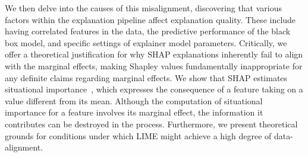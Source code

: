 \documentclass[mnsc,blindrev]{informs3}
\begin{document}
We then delve into the causes of this misalignment, discovering that various factors within the explanation pipeline affect explanation quality. These include having correlated features in the data, the predictive performance of the black box model, and specific settings of explainer model parameters. %
Critically, we offer a theoretical justification for why SHAP explanations inherently fail to align with the marginal effects, making Shapley values fundamentally inappropriate for any definite claims regarding marginal effects. We show that SHAP estimates situational importance~\citep{StrumbeljErik2014Epma}, 
 which expresses the consequence of a feature taking on a value different from its mean. Although the computation of situational importance for a feature involves its marginal effect, the information it contributes can be destroyed in the process. Furthermore, we present theoretical grounds for conditions under which LIME might achieve a high degree of data-alignment.


\end{document}

